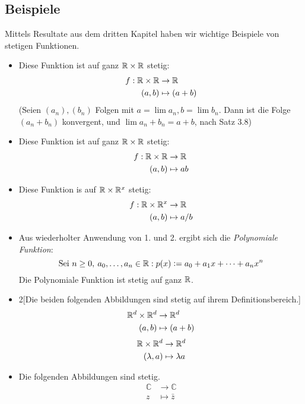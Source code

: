 \subsection*{Beispiele}
Mittels Resultate aus dem dritten Kapitel haben wir wichtige Beispiele von stetigen Funktionen.
\begin{itemize}
\item Diese Funktion ist auf ganz $\mathbb{R}\times\mathbb{R}$ stetig: \begin{align*}f:\mathbb{R}\times\mathbb{R}&\to\mathbb{R} \\ (a,b) &\mapsto (a+b) \end{align*} (Seien $(a_{n}), (b_{n})$ Folgen mit $a = \lim{a_{n}}, b = \lim{b_{n}}$. Dann ist die Folge $(a_{n} + b_{n})$ konvergent, und $\lim{a_{n}+b_{n}} = a + b$, nach Satz 3.8) 
\item Diese Funktion ist auf ganz $\mathbb{R}\times\mathbb{R}$ stetig:
\begin{align*}f:\mathbb{R}\times\mathbb{R}&\to\mathbb{R} \\ (a,b)&\mapsto ab \end{align*}
\item Diese Funktion is auf $\mathbb{R}\times\mathbb{R}^{x}$ stetig:
\begin{align*}f:\mathbb{R}\times\mathbb{R}^{x}&\to\mathbb{R} \\ (a,b)&\mapsto a/b \end{align*}
\item Aus wiederholter Anwendung von 1. und 2. ergibt sich die \emph{Polynomiale Funktion}:
\[\text{Sei } n \geq 0,\: a_{0}, \dots, a_{n}\in\mathbb{R}: p(x)\vcentcolon= a_{0} + a_{1}x + \dots + a_{n}x^{n} \]
Die Polynomiale Funktion ist stetig auf ganz $\mathbb{R}$.
\item \begin{multicols}{2}[Die beiden folgenden Abbildungen sind stetig auf ihrem Definitionsbereich.]\begin{align*} \mathbb{R}^{d}\times\mathbb{R}^{d}&\to\mathbb{R}^{d} \\ (a,b)&\mapsto(a+b) \end{align*} \columnbreak \begin{align*} \mathbb{R}\times\mathbb{R}^{d}&\to\mathbb{R}^{d} \\ (\lambda,a)&\mapsto\lambda a \end{align*} \end{multicols}
\item Die folgenden Abbildungen sind stetig.
\begin{align*} \mathbb{C} &\to \mathbb{C} \\ z &\mapsto \bar{z}\end{align*}

\end{itemize}
